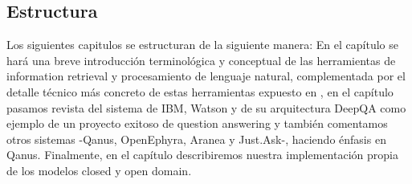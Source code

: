 \subsection*{Estructura}

Los siguientes capitulos se estructuran de la siguiente manera: En el capítulo  se hará una breve introducción terminológica y conceptual de las herramientas de information retrieval y procesamiento de lenguaje natural, complementada por el detalle técnico más concreto de estas herramientas expuesto en , en el capítulo  pasamos revista del sistema de IBM, Watson y de su arquitectura DeepQA como ejemplo de un proyecto exitoso de question answering y también comentamos otros sistemas -Qanus, OpenEphyra, Aranea y Just.Ask-, haciendo énfasis en Qanus. Finalmente, en el capítulo  describiremos nuestra implementación propia de los modelos closed y open domain.


\bigskip
